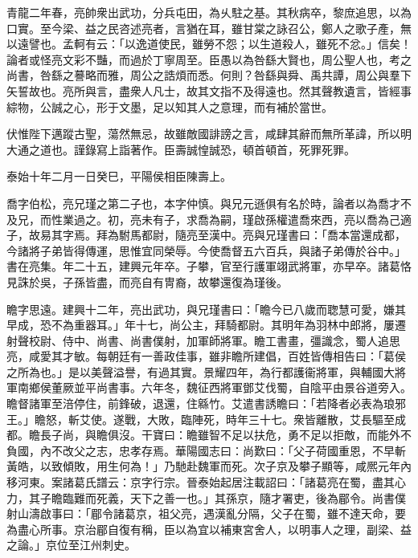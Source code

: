 \begin{pinyinscope}
青龍二年春，亮帥衆出武功，分兵屯田，為乆駐之基。其秋病卒，黎庶追思，以為口實。至今梁、益之民咨述亮者，言猶在耳，雖甘棠之詠召公，鄭人之歌子產，無以遠譬也。孟軻有云：「以逸道使民，雖勞不怨；以生道殺人，雖死不忿。」信矣！論者或怪亮文彩不豔，而過於丁寧周至。臣愚以為咎繇大賢也，周公聖人也，考之尚書，咎繇之謩略而雅，周公之誥煩而悉。何則？咎繇與舜、禹共譚，周公與羣下矢誓故也。亮所與言，盡衆人凡士，故其文指不及得遠也。然其聲教遺言，皆經事綜物，公誠之心，形于文墨，足以知其人之意理，而有補於當世。

伏惟陛下邁蹤古聖，蕩然無忌，故雖敵國誹謗之言，咸肆其辭而無所革諱，所以明大通之道也。謹錄寫上詣著作。臣壽誠惶誠恐，頓首頓首，死罪死罪。

泰始十年二月一日癸巳，平陽侯相臣陳壽上。

喬字伯松，亮兄瑾之第二子也，本字仲慎。與兄元遜俱有名於時，論者以為喬才不及兄，而性業過之。初，亮未有子，求喬為嗣，瑾啟孫權遣喬來西，亮以喬為己適子，故易其字焉。拜為駙馬都尉，隨亮至漢中。亮與兄瑾書曰：「喬本當還成都，今諸將子弟皆得傳運，思惟宜同榮辱。今使喬督五六百兵，與諸子弟傳於谷中。」書在亮集。年二十五，建興元年卒。子攀，官至行護軍翊武將軍，亦早卒。諸葛恪見誅於吳，子孫皆盡，而亮自有冑裔，故攀還復為瑾後。

瞻字思遠。建興十二年，亮出武功，與兄瑾書曰：「瞻今已八歲而聦慧可愛，嫌其早成，恐不為重器耳。」年十七，尚公主，拜騎都尉。其明年為羽林中郎將，屢遷射聲校尉、侍中、尚書、尚書僕射，加軍師將軍。瞻工書畫，彊識念，蜀人追思亮，咸愛其才敏。每朝廷有一善政佳事，雖非瞻所建倡，百姓皆傳相告曰：「葛侯之所為也。」是以美聲溢譽，有過其實。景耀四年，為行都護衞將軍，與輔國大將軍南鄉侯董厥並平尚書事。六年冬，魏征西將軍鄧艾伐蜀，自陰平由景谷道旁入。瞻督諸軍至涪停住，前鋒破，退還，住緜竹。艾遣書誘瞻曰：「若降者必表為琅邪王。」瞻怒，斬艾使。遂戰，大敗，臨陣死，時年三十七。衆皆離散，艾長驅至成都。瞻長子尚，與瞻俱沒。干寶曰：瞻雖智不足以扶危，勇不足以拒敵，而能外不負國，內不改父之志，忠孝存焉。華陽國志曰：尚歎曰：「父子荷國重恩，不早斬黃皓，以致傾敗，用生何為！」乃馳赴魏軍而死。次子京及攀子顯等，咸熈元年內移河東。案諸葛氏譜云：京字行宗。晉泰始起居注載詔曰：「諸葛亮在蜀，盡其心力，其子瞻臨難而死義，天下之善一也。」其孫京，隨才署吏，後為郿令。尚書僕射山濤啟事曰：「郿令諸葛京，祖父亮，遇漢亂分隔，父子在蜀，雖不達天命，要為盡心所事。京治郿自復有稱，臣以為宜以補東宮舍人，以明事人之理，副梁、益之論。」京位至江州刺史。


\end{pinyinscope}
